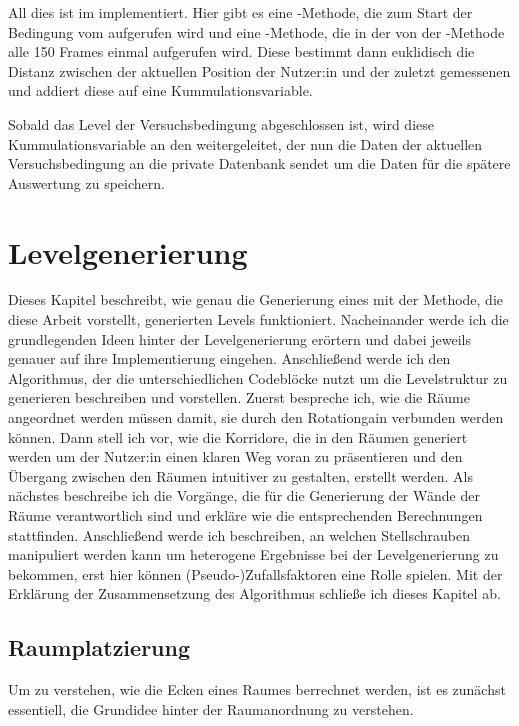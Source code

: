 All dies ist im  implementiert. Hier gibt es eine -Methode, die zum Start der Bedingung vom  aufgerufen wird und eine -Methode, die in der von der -Methode alle 150 Frames einmal aufgerufen wird. Diese bestimmt dann euklidisch die Distanz zwischen der aktuellen Position der Nutzer:in und der zuletzt gemessenen und addiert diese auf eine Kummulationsvariable.

Sobald das Level der Versuchsbedingung abgeschlossen ist, wird diese Kummulationsvariable an den  weitergeleitet, der nun die Daten der aktuellen Versuchsbedingung an die private Datenbank sendet um die Daten für die spätere Auswertung zu speichern.

\chapter{Levelgenerierung}
\label{chapter:generate}
Dieses Kapitel beschreibt, wie genau die Generierung eines mit der Methode, die diese Arbeit vorstellt, generierten Levels funktioniert. Nacheinander werde ich die grundlegenden Ideen hinter der Levelgenerierung erörtern und dabei jeweils genauer auf ihre Implementierung eingehen. Anschließend werde ich den Algorithmus, der die unterschiedlichen Codeblöcke nutzt um die Levelstruktur zu generieren beschreiben und vorstellen.
Zuerst bespreche ich, wie die Räume angeordnet werden müssen damit, sie durch den Rotationgain verbunden werden können. Dann stell ich vor, wie die Korridore, die in den Räumen generiert werden um der Nutzer:in einen klaren Weg voran zu präsentieren und den Übergang zwischen den Räumen intuitiver zu gestalten, erstellt werden. Als nächstes beschreibe ich die Vorgänge, die für die Generierung der Wände der Räume verantwortlich sind und erkläre wie die entsprechenden Berechnungen stattfinden.
Anschließend werde ich beschreiben, an welchen Stellschrauben manipuliert werden kann um heterogene Ergebnisse bei der Levelgenerierung zu bekommen, erst hier können (Pseudo-)Zufallsfaktoren eine Rolle spielen.
Mit der Erklärung der Zusammensetzung des Algorithmus schließe ich dieses Kapitel ab.

\section{Raumplatzierung}

Um zu verstehen, wie die Ecken eines Raumes berrechnet werden, ist es zunächst essentiell, die Grundidee hinter der Raumanordnung zu verstehen.

